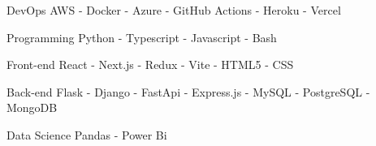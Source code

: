 

\begin{cvskills}

  \cvskill
    {DevOps} %
    {AWS - Docker - Azure - GitHub Actions - Heroku - Vercel} %

  \cvskill
    {Programming} %
    {Python - Typescript - Javascript - Bash} %

  \cvskill
      {Front-end} %
      {React - Next.js - Redux - Vite - HTML5 - CSS} %

  \cvskill
    {Back-end} %
    {Flask - Django - FastApi - Express.js -  MySQL - PostgreSQL - MongoDB} %

  \cvskill
    {Data Science} %
    {Pandas - Power Bi} %

\end{cvskills}
